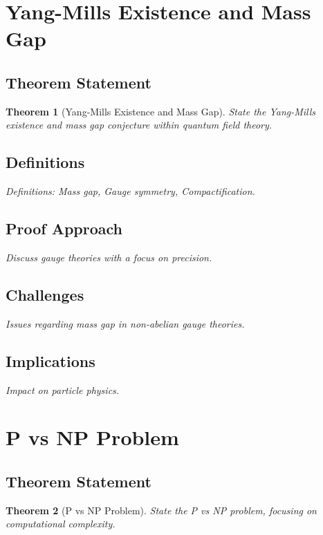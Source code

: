 \documentclass[12pt, a4paper]{article}
\newtheorem{theorem}{Theorem}[section]
\begin{document}
\section{Yang-Mills Existence and Mass Gap}
\subsection{Theorem Statement}
\begin{theorem}[Yang-Mills Existence and Mass Gap]
\label{thm:yang_mills}
\textit{State the Yang-Mills existence and mass gap conjecture within quantum field theory.}
\end{theorem}

\subsection{Definitions}
\textit{Definitions: Mass gap, Gauge symmetry, Compactification.}

\subsection{Proof Approach}
\textit{Discuss gauge theories with a focus on precision.}

\subsection{Challenges}
\textit{Issues regarding mass gap in non-abelian gauge theories.}

\subsection{Implications}
\textit{Impact on particle physics.}


\section{P vs NP Problem}
\subsection{Theorem Statement}
\begin{theorem}[P vs NP Problem]
\label{thm:p_vs_np}
\textit{State the P vs NP problem, focusing on computational complexity.}
\end{theorem}
\end{document}
